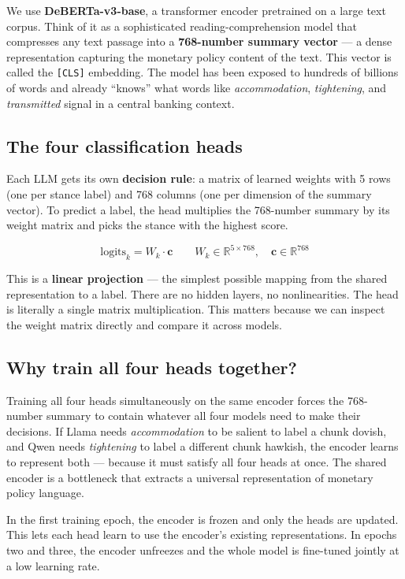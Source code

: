 \documentclass[11pt,a4paper]{article}
\begin{document}
We use \textbf{DeBERTa-v3-base}, a transformer encoder pretrained on a large
text corpus. Think of it as a sophisticated reading-comprehension model that
compresses any text passage into a \textbf{768-number summary vector} --- a
dense representation capturing the monetary policy content of the text. This
vector is called the \texttt{[CLS]} embedding. The model has been exposed to
hundreds of billions of words and already ``knows'' what words like
\textit{accommodation}, \textit{tightening}, and \textit{transmitted} signal in
a central banking context.

\subsection{The four classification heads}

Each LLM gets its own \textbf{decision rule}: a matrix of learned weights with
5 rows (one per stance label) and 768 columns (one per dimension of the summary
vector). To predict a label, the head multiplies the 768-number summary by its
weight matrix and picks the stance with the highest score.

\begin{equation*}
\text{logits}_k = W_k \cdot \mathbf{c} \qquad
W_k \in \mathbb{R}^{5 \times 768}, \quad
\mathbf{c} \in \mathbb{R}^{768}
\end{equation*}

This is a \textbf{linear projection} --- the simplest possible mapping from the
shared representation to a label. There are no hidden layers, no nonlinearities.
The head is literally a single matrix multiplication. This matters because we
can inspect the weight matrix directly and compare it across models.

\subsection{Why train all four heads together?}

Training all four heads simultaneously on the same encoder forces the
768-number summary to contain whatever all four models need to make their
decisions. If Llama needs \textit{accommodation} to be salient to label a
chunk dovish, and Qwen needs \textit{tightening} to label a different chunk
hawkish, the encoder learns to represent both --- because it must satisfy all
four heads at once. The shared encoder is a bottleneck that extracts a
universal representation of monetary policy language.

In the first training epoch, the encoder is frozen and only the heads are
updated. This lets each head learn to use the encoder's existing representations.
In epochs two and three, the encoder unfreezes and the whole model is fine-tuned
jointly at a low learning rate.
\end{document}
